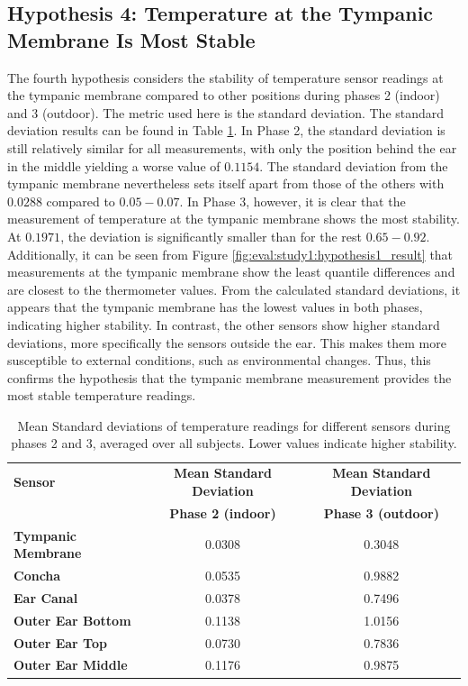 \subsection{Hypothesis 4: Temperature at the Tympanic Membrane Is Most Stable}
\label{subsec:Evaluation:Study1:Hypothesis4}
The fourth hypothesis considers the stability of temperature sensor readings at the tympanic membrane compared to other positions during phases 2 (indoor) and 3 (outdoor).
The metric used here is the standard deviation. 
The standard deviation results can be found in Table \ref{subsec:Evaluation:Study1:Hypothesis4:std_dev_table}. 
In Phase 2, the standard deviation is still relatively similar for all measurements, with only the position behind the ear in the middle yielding a worse value of $0.1154$. 
The standard deviation from the tympanic membrane nevertheless sets itself apart from those of the others with $0.0288$ compared to $0.05-0.07$. 
In Phase 3, however, it is clear that the measurement of temperature at the tympanic membrane shows the most stability. 
At $0.1971$, the deviation is significantly smaller than for the rest $0.65-0.92$. 
Additionally, it can be seen from Figure \ref{fig:eval:study1:hypothesis1_result} that measurements at the tympanic membrane show the least quantile differences and are closest to the thermometer values. 
From the calculated standard deviations, it appears that the tympanic membrane has the lowest values in both phases, indicating higher stability. 
In contrast, the other sensors show higher standard deviations, more specifically the sensors outside the ear. 
This makes them more susceptible to external conditions, such as environmental changes.
Thus, this confirms the hypothesis that the tympanic membrane measurement provides the most stable temperature readings.

\begin{table}[t]
\centering
\begin{tabular}{|l|c|c|}
\hline
\textbf{Sensor} & \textbf{Mean Standard Deviation} & \textbf{Mean Standard Deviation} \\
& \textbf{Phase 2 (indoor)} & \textbf{Phase 3 (outdoor)} \\
\hline
\textbf{Tympanic Membrane} & 0.0308 & 0.3048 \\
\textbf{Concha} & 0.0535 & 0.9882 \\
\textbf{Ear Canal} & 0.0378 & 0.7496 \\
\textbf{Outer Ear Bottom} & 0.1138 & 1.0156 \\
\textbf{Outer Ear Top} & 0.0730 & 0.7836 \\
\textbf{Outer Ear Middle} & 0.1176 & 0.9875 \\
\hline
\end{tabular}
\caption{Mean Standard deviations of temperature readings for different sensors during phases 2 and 3, averaged over all subjects. Lower values indicate higher stability.}
\label{subsec:Evaluation:Study1:Hypothesis4:std_dev_table}
\end{table}

